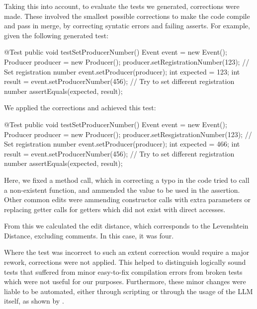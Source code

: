 Taking this into account, to evaluate the tests we generated, corrections were made. These involved the smallest possible corrections to make the code compile and pass in merge, by correcting syntatic errors and failing asserts.
For example, given the following generated test:
\begin{response}
@Test
public void testSetProducerNumber() {
    Event event = new Event();
    Producer producer = new Producer();
    producer.setRegistrationNumber(123); // Set registration number
    event.setProducer(producer);
    int expected = 123;
    int result = event.setProducerNumber(456); // Try to set different registration number
    assertEquals(expected, result);
}
\end{response}
We applied the corrections and achieved this test:
\begin{response}
@Test
public void testSetProducerNumber() {
    Event event = new Event();
    Producer producer = new Producer();
    producer.setResgistrationNumber(123); // Set registration number
    event.setProducer(producer);
    int expected = 466;
    int result = event.setProducerNumber(456); // Try to set different registration number
    assertEquals(expected, result);
}
\end{response}
Here, we fixed a method call, which in correcting a typo in the code tried to call a non-existent function, and ammended the value to be used in the assertion.
Other common edits were ammending constructor calls with extra parameters or replacing getter calls for getters which did not exist with direct accesses.

From this we calculated the edit distance, which corresponds to the Levenshtein Distance, excluding comments.
In this case, it was four.

Where the test was incorrect to such an extent correction would require a major rework, corrections were not applied. This helped to distinguish logically sound tests
that suffered from minor easy-to-fix compilation errors from broken tests which were not useful for our purposes. Furthermore, these minor changes were liable to be automated,
either through scripting or through the usage of the LLM itself, as shown by .

